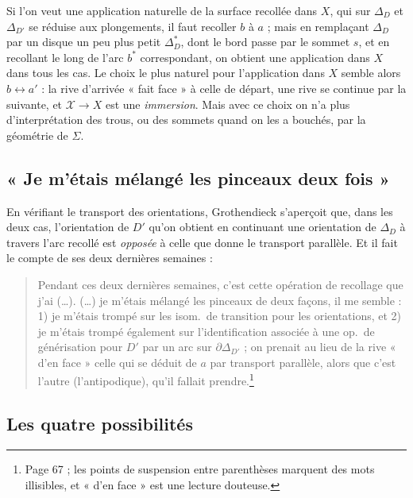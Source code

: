 \documentclass[11pt,a4paper]{article}
\begin{document}
Si l'on veut une application naturelle de la surface recollée dans $X$, qui
sur $\Delta_D$ et $\Delta_{D'}$ se réduise aux plongements, il faut
recoller $b$ à $a$ ; mais en remplaçant $\Delta_D$ par un disque un peu plus
petit $\Delta^{*}_D$, dont le bord passe par le sommet $s$, et en recollant le
long de l'arc $b^{*}$ correspondant, on obtient une application dans $X$ dans
tous les cas. Le choix le plus naturel pour l'application dans $X$ semble alors
$b \leftrightarrow a'$ : la rive d'arrivée « fait face » à celle de départ, une
rive se continue par la suivante, et $\mathcal{X} \to X$ est une
\emph{immersion}. Mais avec ce choix on n'a plus d'interprétation des trous, ou
des sommets quand on les a bouchés, par la géométrie de $\Sigma$.

\subsection*{« Je m'étais mélangé les pinceaux deux fois »}

En vérifiant le transport des orientations, Grothendieck s'aperçoit que, dans
les deux cas, l'orientation de $D'$ qu'on obtient en continuant une orientation
de $\Delta_D$ à travers l'arc recollé est \emph{opposée} à celle que donne le
transport parallèle. Et il fait le compte de ses deux dernières semaines :
\begin{quote}
Pendant ces deux dernières semaines, c'est cette opération de recollage que
j'ai (\ldots). (\ldots) je m'étais mélangé les pinceaux de deux façons, il me
semble : 1) je m'étais trompé sur les isom.\ de transition pour les
orientations, et 2) je m'étais trompé également sur l'identification associée à
une op.\ de générisation pour $D'$ par un arc sur $\partial\Delta_{D'}$ ; on
prenait au lieu de la rive « d'en face » celle qui se déduit de $a$ par transport
parallèle, alors que c'est l'autre (l'antipodique), qu'il fallait
prendre.\footnote{Page 67 ; les points de suspension entre parenthèses marquent des mots illisibles, et
« d'en face » est une lecture douteuse.}
\end{quote}

\subsection*{Les quatre possibilités}
\end{document}
